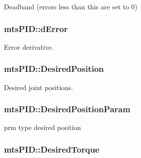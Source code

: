 Deadband (errors less than this are set to 0) 

\hypertarget{classmts_p_i_d_ae171fb161398be9d69e7e647625c6cd6}{
\subsubsection[{d\-Error}]{ mts\-P\-I\-D\-::d\-Error\hspace{0.3cm}{\ttfamily [protected]}}}\label{classmts_p_i_d_ae171fb161398be9d69e7e647625c6cd6}


Error derivative. 

\hypertarget{classmts_p_i_d_a261ceede64958a11dc2f2b58207a83e7}{
\subsubsection[{Desired\-Position}]{ mts\-P\-I\-D\-::\-Desired\-Position\hspace{0.3cm}{\ttfamily [protected]}}}\label{classmts_p_i_d_a261ceede64958a11dc2f2b58207a83e7}


Desired joint positions. 

\hypertarget{classmts_p_i_d_a7ef37febb5f1248dcccfa6a0e857b7a9}{
\subsubsection[{Desired\-Position\-Param}]{ mts\-P\-I\-D\-::\-Desired\-Position\-Param\hspace{0.3cm}{\ttfamily [protected]}}}\label{classmts_p_i_d_a7ef37febb5f1248dcccfa6a0e857b7a9}


prm type desired position 

\hypertarget{classmts_p_i_d_a7756c43c46391cfc929a46c0e99b12a0}{
\subsubsection[{Desired\-Torque}]{ mts\-P\-I\-D\-::\-Desired\-Torque\hspace{0.3cm}{\ttfamily [protected]}}}\label{classmts_p_i_d_a7756c43c46391cfc929a46c0e99b12a0}


